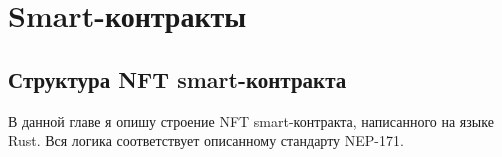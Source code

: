 

\section{Smart-контракты}
\label{section.4}

\subsection{Структура NFT smart-контракта}
\label{section.4.1}
В данной главе я опишу строение NFT smart-контракта, написанного на языке Rust. Вся логика соответствует описанному стандарту NEP-171\cite{nftstandart}.
